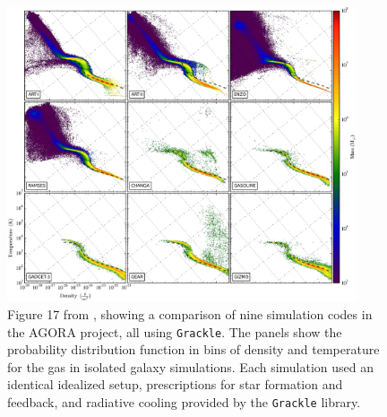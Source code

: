 \documentclass[11pt]{article}
\newcommand{\grackle}{\texttt{Grackle}}
\begin{document}
\begin{flushleft}
\begin{figure}[h]
\begin{center}
\includegraphics[width=0.92\textwidth]{figures/fig17.eps}
\caption{Figure 17 from \citet{2016ApJ...833..202K}, showing a
  comparison of nine simulation codes in the AGORA project, all using
  \grackle{}.  The panels show the probability distribution function
  in bins of density and temperature for the gas in isolated galaxy
  simulations.  Each simulation used an identical idealized setup,
  prescriptions for star formation and feedback, and radiative cooling
  provided by the \grackle{} library.}
\label{fig:AGORA}
\end{center}
\vspace*{-2\baselineskip}
\end{figure}


\end{flushleft}
\end{document}
